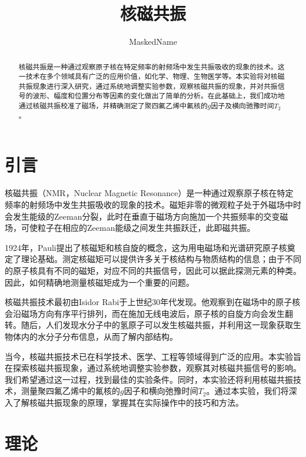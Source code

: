 \documentclass[font=default]{mpltx}
\begin{document}
\title{核磁共振} %
\author{MaskedName} %
\date{}
\renewcommand\d{{\rm d}}
\begin{abstract}
核磁共振是一种通过观察原子核在特定频率的射频场中发生共振吸收的现象的技术。这一技术在多个领域具有广泛的应用价值，如化学、物理、生物医学等。本实验将对核磁共振现象进行深入研究，通过系统地调整实验参数，观察核磁共振的现象，并对共振信号的波形、幅度和位置分布等因素的变化做出了简单的分析。在此基础上，我们成功地通过核磁共振校准了磁场，并精确测定了聚四氟乙烯中氟核的$g$因子及横向驰豫时间$T_2$。
\end{abstract}
\keywords{}

\maketitle

\section{引言}
核磁共振（NMR，Nuclear Magnetic Resonance）是一种通过观察原子核在特定频率的射频场中发生共振吸收的现象的技术。磁矩非零的微观粒子处于外磁场中时会发生能级的Zeeman分裂，此时在垂直于磁场方向施加一个共振频率的交变磁场，可使粒子在相应的Zeeman能级之间发生共振跃迁，此即磁共振。

1924年，Pauli提出了核磁矩和核自旋的概念，这为用电磁场和光谱研究原子核奠定了理论基础。测定核磁矩可以提供许多关于核结构与物质结构的信息；由于不同的原子核具有不同的磁矩，对应不同的共振信号，因此可以据此探测元素的种类。因此，如何精确地测量核磁矩成为一个重要的问题。

核磁共振技术最初由Isidor Rabi于上世纪30年代发现。他观察到在磁场中的原子核会沿磁场方向有序平行排列，而在施加无线电波后，原子核的自旋方向会发生翻转\cite{rabi1938new}。随后，人们发现水分子中的氢原子可以发生核磁共振，并利用这一现象获取生物体内的水分子分布信息，从而了解内部结构。

当今，核磁共振技术已在科学技术、医学、工程等领域得到广泛的应用。本实验旨在探索核磁共振现象，通过系统地调整实验参数，观察其对核磁共振信号的影响。我们希望通过这一过程，找到最佳的实验条件。同时，本实验还将利用核磁共振技术，测量聚四氟乙烯中的氟核的$g$因子和横向弛豫时间$T_2$。通过本实验，我们将深入了解核磁共振现象的原理，掌握其在实际操作中的技巧和方法。
\section{理论\cite{book}}
\end{document}
